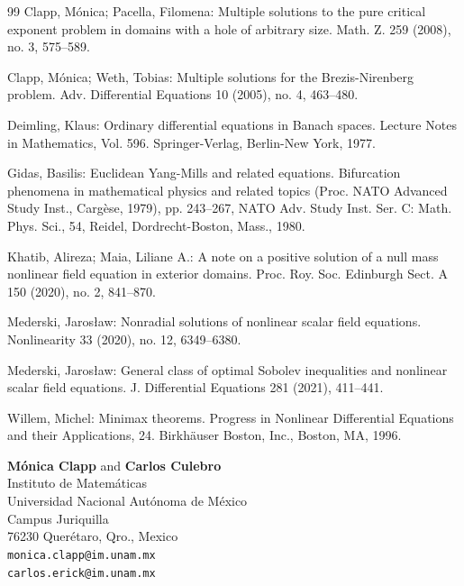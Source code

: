 \documentclass[10pt,letterpaper]{article}
\numberwithin{equation}{section}
\begin{document}
\begin{thebibliography}{99}
Clapp, Mónica; Pacella, Filomena: Multiple solutions to the pure critical exponent problem in domains with a hole of arbitrary size. Math. Z. 259 (2008), no. 3, 575–589.

 Clapp, Mónica; Weth, Tobias: Multiple solutions for the Brezis-Nirenberg problem. Adv. Differential Equations 10 (2005), no. 4, 463–480.

Deimling, Klaus: Ordinary differential equations in Banach spaces. Lecture Notes in Mathematics, Vol. 596. Springer-Verlag, Berlin-New York, 1977. 

Gidas, Basilis: Euclidean Yang-Mills and related equations. Bifurcation phenomena in mathematical physics and related topics (Proc. NATO Advanced Study Inst., Cargèse, 1979), pp. 243--267, NATO Adv. Study Inst. Ser. C: Math. Phys. Sci., 54, Reidel, Dordrecht-Boston, Mass., 1980.

Khatib, Alireza; Maia, Liliane A.: A note on a positive solution of a null mass nonlinear field equation in exterior domains. Proc. Roy. Soc. Edinburgh Sect. A 150 (2020), no. 2, 841–870.

Mederski, Jarosław: Nonradial solutions of nonlinear scalar field equations. Nonlinearity 33 (2020), no. 12, 6349–6380.

Mederski, Jarosław: General class of optimal Sobolev inequalities and nonlinear scalar field equations. J. Differential Equations 281 (2021), 411–441.

Willem, Michel: Minimax theorems. Progress in Nonlinear Differential Equations and their Applications, 24. Birkhäuser Boston, Inc., Boston, MA, 1996.
		
\end{thebibliography}

\bigskip

\begin{flushleft}
\textbf{Mónica Clapp} and \textbf{Carlos Culebro}\\
Instituto de Matemáticas\\
Universidad Nacional Autónoma de México \\
Campus Juriquilla\\
76230 Querétaro, Qro., Mexico\\
\texttt{monica.clapp@im.unam.mx}\\
\texttt{carlos.erick@im.unam.mx} 
\end{flushleft}
	
\end{document}

